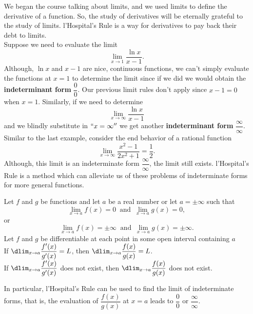 \documentclass{book}
\begin{document}
We began the course talking about limits, and we used limits to define the derivative of a function. So, the study of derivatives will be eternally grateful to the study of limits. l'Hospital's Rule is a way for derivatives to pay back their debt to limits. \\

Suppose we need to evaluate the limit \[\lim_{x\to 1} \dfrac{\ln x}{x-1}.\] Although, $\ln x$ and $x-1$ are nice, continuous functions, we can't simply evaluate the functions at $x=1$ to determine the limit since if we did we would obtain the \textbf{indeterminant form} $\dfrac{0}{0}$. Our previous limit rules don't apply since $x-1 = 0$ when $x =1$. Similarly, if we need to determine \[\lim_{x\to \infty} \dfrac{\ln x}{x-1}\] and we blindly substitute in $``x=\infty''$ we get another \textbf{indeterminant form} $\dfrac{\infty}{\infty}$. \\

Similar to the last example, consider the end behavior of a rational function
\[\lim_{x\to \infty} \dfrac{x^2-1}{2x^2+1} = \dfrac{1}{2}.\] Although, this limit is an indeterminate form $\dfrac{\infty}{\infty}$, the limit still exists.  l'Hospital's Rule is a method which can alleviate us of these problems of indeterminate forms for more general functions.\\

\begin{Thm} Let $f$ and $g$ be functions and let $a$ be a real number or let $a = \pm \infty$ such that \[\lim_{x\to a} f(x) = 0\;\;\mbox{and}\;\; \lim_{x\to a} g(x) = 0,\] or \[\lim_{x\to a} f(x) = \pm \infty\;\;\mbox{and}\;\; \lim_{x\to a} g(x) = \pm\infty.\] Let $f$ and $g$ be differentiable at each point in some open interval containing $a$\footnotemark\\

If $\dlim_{x\to a} \dfrac{f'(x)}{g'(x)} = L$, then $\dlim_{x\to a} \dfrac{f(x)}{g(x)}  = L$.\\

If $\dlim_{x\to a} \dfrac{f'(x)}{g'(x)}$ does not exist, then $\dlim_{x\to a} \dfrac{f(x)}{g(x)}$ does not exist.\\
\end{Thm}

\begin{Rem} In particular, l'Hospital's Rule can be used to find the limit of indeterminate forms, that is, the evaluation of $\dfrac{f(x)}{g(x)}$ at $x= a$ leads to $\dfrac{0}{0}$ or $\dfrac{\infty}{\infty}.$
\end{Rem}\vs
\end{document}
